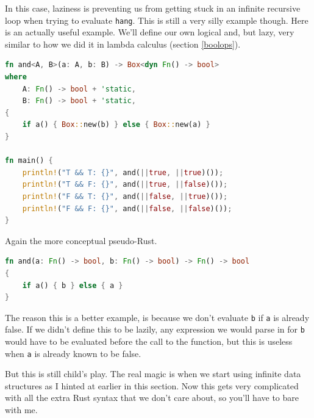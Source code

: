 \documentclass[11pt]{article}
\begin{document}
In this case, laziness is preventing us from getting stuck in an infinite
recursive loop when trying to evaluate \texttt{hang}. This is still a very
silly example though. Here is an actually useful example. We'll define our own
logical and, but lazy, very similar to how we did it in lambda calculus
(section \ref{boolops}).

\begin{lstlisting}[language=Rust]
fn and<A, B>(a: A, b: B) -> Box<dyn Fn() -> bool>
where
    A: Fn() -> bool + 'static,
    B: Fn() -> bool + 'static,
{
    if a() { Box::new(b) } else { Box::new(a) }
}

fn main() {
    println!("T && T: {}", and(||true, ||true)());
    println!("T && F: {}", and(||true, ||false)());
    println!("F && T: {}", and(||false, ||true)());
    println!("F && F: {}", and(||false, ||false)());
}
\end{lstlisting}
Again the more conceptual pseudo-Rust.
\begin{lstlisting}[language=Rust]
fn and(a: Fn() -> bool, b: Fn() -> bool) -> Fn() -> bool
{
    if a() { b } else { a }
}
\end{lstlisting}

The reason this is a better example, is because we don't evaluate \texttt{b} if
\texttt{a} is already false. If we didn't define this to be lazily, any
expression we would parse in for \texttt{b} would have to be evaluated before
the call to the function, but this is useless when \texttt{a} is already known
to be false.

But this is still child's play. The real magic is when we start using infinite
data structures as I hinted at earlier in this section. Now this gets very
complicated with all the extra Rust syntax that we don't care about, so you'll
have to bare with me.
\end{document}

